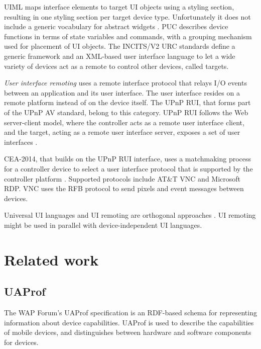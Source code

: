 \ac{UIML} maps interface elements to target UI objects using a styling section, resulting in one styling section per target device type. Unfortunately it does not include a generic vocabulary for abstract widgets \cite{Zimmermann2007}. \ac{PUC} describes device functions in terms of state variables and commands, with a grouping mechanism used for placement of UI objects. The \ac{INCITS/V2 URC} standards define a generic framework and an XML-based user interface language to let a wide variety of devices act as a remote to control other devices, called targets.

\emph{User interface remoting} uses a remote interface protocol that relays I/O events between an application and its user interface. The user interface resides on a remote platform instead of on the device itself. The \ac{UPnP} \ac{RUI}, that forms part of the \ac{UPnP} AV standard,  belong to this category. \ac{UPnP} \ac{RUI} follows the Web server-client model, where the controller acts as a remote user interface client, and the target, acting as a remote user interface server, exposes a set of user interfaces \cite{UPnPForum}.

CEA-2014, that builds on the \ac{UPnP} \ac{RUI} interface, uses a matchmaking process for a controller device to select a user interface protocol that is supported by the controller platform \cite{Zimmermann2007}. Supported protocols include AT\&T \ac{VNC} and Microsoft \ac{RDP}. \ac{VNC} uses the \ac{RFB} protocol to send pixels and event messages between devices.


Universal UI languages and UI remoting are orthogonal approaches \cite{Lee2006}. UI remoting might be used in parallel with device-independent UI languages.



\section{Related work}

\subsection{UAProf}

The WAP Forum's \ac{UAProf} specification is an \ac{RDF}-based schema for representing information about device capabilities. UAProf is used to describe the capabilities of mobile devices, and distinguishes between hardware and software components for devices.

